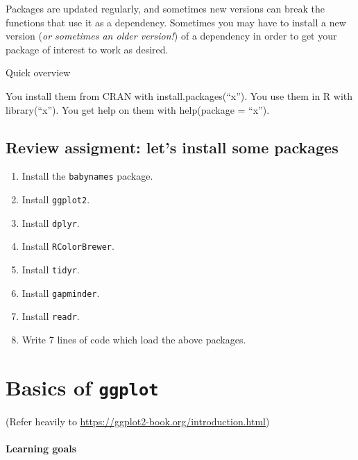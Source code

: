 \documentclass[
]{book}
\begin{document}
Packages are updated regularly, and sometimes new versions can break the functions that use it as a dependency. Sometimes you may have to install a new version (\emph{or sometimes an older version!}) of a dependency in order to get your package of interest to work as desired.

Quick overview

You install them from CRAN with install.packages(``x'').
You use them in R with library(``x'').
You get help on them with help(package = ``x'').

\hypertarget{review-assigment-lets-install-some-packages}{%
\section*{Review assigment: let's install some packages}\label{review-assigment-lets-install-some-packages}}

\begin{enumerate}
\def\labelenumi{\arabic{enumi}.}
\item
  Install the \texttt{babynames} package.
\item
  Install \texttt{ggplot2}.
\item
  Install \texttt{dplyr}.
\item
  Install \texttt{RColorBrewer}.
\item
  Install \texttt{tidyr}.
\item
  Install \texttt{gapminder}.
\item
  Install \texttt{readr}.
\item
  Write 7 lines of code which load the above packages.
\end{enumerate}

\hypertarget{basics-of-ggplot}{%
\chapter{\texorpdfstring{Basics of \texttt{ggplot}}{Basics of ggplot}}\label{basics-of-ggplot}}

(Refer heavily to \url{https://ggplot2-book.org/introduction.html})

\hypertarget{learning-goals-8}{%
\subsubsection*{Learning goals}\label{learning-goals-8}}
\end{document}
